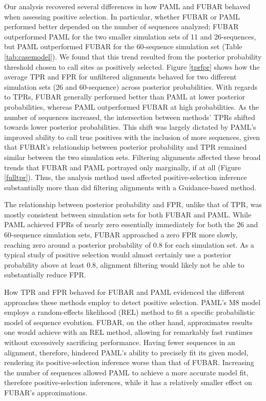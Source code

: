 \documentclass[10pt]{article}
\begin{document}
Our analysis recovered several differences in how PAML and FUBAR behaved when assessing positive selection. In particular, whether FUBAR or PAML performed better depended on the number of sequences analyzed; FUBAR outperformed PAML for the two smaller simulation sets of 11 and 26-sequences, but PAML outperformed FUBAR for the 60-sequence simulation set (Table \ref{tab:casemodel}). We found that this trend resulted from the posterior probability threshold chosen to call sites as positively selected. Figure \ref{tprfpr} shows how the average TPR and FPR for unfiltered alignments behaved for two different simulation sets (26 and 60-sequence) across posterior probabilities. With regards to TPRs,
FUBAR generally performed better than PAML at lower posterior probabilities, whereas PAML outperformed FUBAR at high probabilities. As the number of sequences increased, the intersection between methods' TPRs shifted towards lower posterior probabilities. This shift was largely dictated by PAML's improved ability to call true positives with the inclusion of more sequences, given that FUBAR's relationship between posterior probability and TPR remained similar between the two simulation sets.  Filtering alignments affected these broad trends that FUBAR and PAML portrayed only marginally, if at all (Figure \ref{fulltpr}). Thus, the analysis method used affected positive-selection inference substantially more than did filtering  alignments with a Guidance-based method. 

The relationship between posterior probability and FPR, unlike that of TPR, was mostly consistent between simulation sets for both FUBAR and PAML. While PAML achieved FPRs of nearly zero essentially immediately for both the 26 and 60-sequence simulation sets, FUBAR approached a zero FPR more slowly, reaching zero around a posterior probability of 0.8 for each simulation set. As a typical study of positive selection would almost certainly use a posterior probability above at least 0.8, alignment filtering would likely not be able to substantially reduce FPR.

How TPR and FPR behaved for FUBAR and PAML evidenced the different approaches these methods employ to detect positive selection. PAML's M8 model employs a random-effects likelihood (REL) method \citep{NielsenYang1998} to fit a specific probabilistic model of sequence evolution. FUBAR, on the other hand, approximates results one would achieve with an REL method, allowing for remarkably fast runtimes without excessively sacrificing performance. Having fewer sequences in an alignment, therefore, hindered PAML's ability to precisely fit its given model, rendering its positive-selection inference worse than that of FUBAR. Increasing the number of sequences allowed PAML to achieve a more accurate model fit, therefore positive-selection inferences, while it has a relatively smaller effect on FUBAR's approximations.
\end{document}
